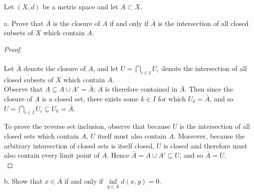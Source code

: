 Let $(X, d)$ be a metric space and let $A \subset X$.

a.  Prove that $\bar{A}$ is the closure of $A$ if and only if $\bar{A}$ is the intersection of all closed subsets of $X$
    which contain $A$.

\begin{proof}\ \\\\
    Let $\bar{A}$ denote the closure of $A$, and let $U = \bigcap\limits_{i \in I}{U_i}$ denote the intersection of all 
    closed subsets of $X$ which contain $A$.\ \\

    Observe that $A \subseteq A \cup A' = \bar{A}$; $A$ is therefore contained in $\bar{A}$. Then since the closure of
    $A$ is a closed set, there exists some $k \in I$ for which $U_k = \bar{A}$, and so 
    $U = \bigcap\limits_{i \in I}{U_i} \subseteq U_k = \bar{A}$.

    To prove the reverse set inclusion, observe that because $U$ is the intersection of all closed sets which contain 
    $A$, $U$ itself must also contain $A$. Moreover, because the arbitrary intersection of closed sets is itself closed,
    $U$ is closed and therefore must also contain every limit point of $A$. Hence $\bar{A} = A \cup A' \subseteq U$, and
    so $\bar{A} = U$.
    \ \\
 \end{proof}

\pagebreak

b.  Show that $x \in \bar{A}$ if and only if $\inf\limits_{y \in A}{d(x, y)} = 0$.

